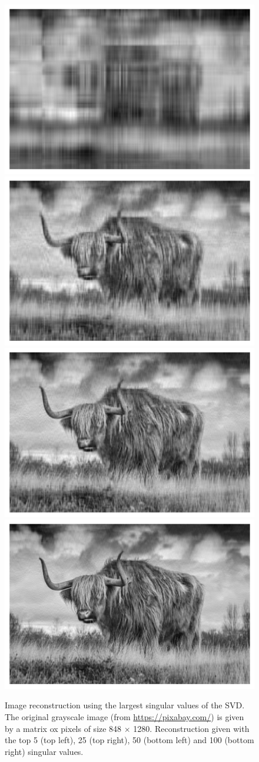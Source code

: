 \begin{figure}
        \centering
            \includegraphics[width=.45\textwidth]{./Illustrations/svd_5}
\includegraphics[width=.45\textwidth]{./Illustrations/svd_25}
\includegraphics[width=.45\textwidth]{./Illustrations/svd_50}
\includegraphics[width=.45\textwidth]{./Illustrations/svd_100}
        \caption{\small Image reconstruction using  the largest singular values of the SVD. The original grayscale image (from \url{https://pixabay.com/}) is given by a matrix ox pixels of size 848 $\times$ 1280. Reconstruction given with the top 5 (top left), 25 (top right), 50 (bottom left) and 100 (bottom right) singular values.} 
        \label{fig:svd:rec}
    \end{figure}

